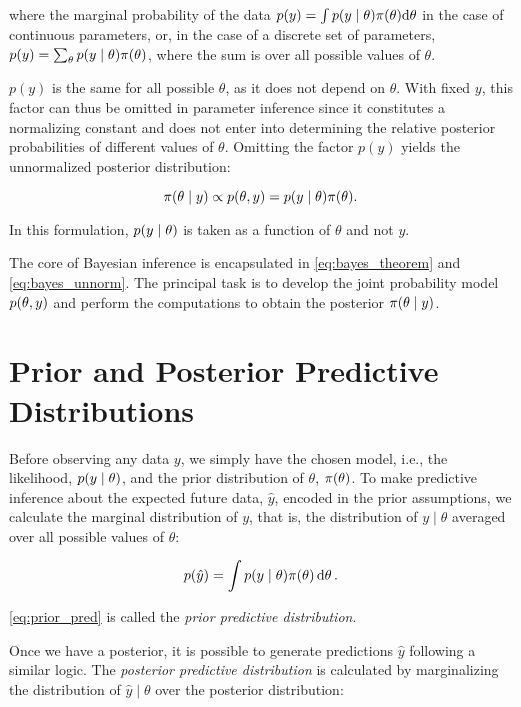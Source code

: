 where the marginal probability of the data $p(y) = \int p \qty(y \mid \theta) \pi \qty(\theta) \dd \theta$ in the case of continuous parameters, or, in the case of a discrete set of parameters, $p(y) = \sum_\theta p \qty(y \mid \theta) \pi \qty(\theta)$, where the sum is over all possible values of $\theta$.

$p(y)$ is the same for all possible $\theta$, as it does not depend on $\theta$. With fixed $y$, this factor can thus be omitted in parameter inference since it constitutes a normalizing constant and does not enter into determining the relative posterior probabilities of different values of $\theta$. Omitting the factor $p(y)$ yields the unnormalized posterior distribution: 

\begin{equation}\label{eq:bayes_unnorm}
    \pi \qty(\theta \mid y) \propto p(\theta, y) =  p \qty(y \mid \theta) \pi \qty(\theta) .
\end{equation}

In this formulation, $p \qty(y \mid \theta)$ is taken as a function of $\theta$ and not $y$.  

The core of Bayesian inference is encapsulated in \autoref{eq:bayes_theorem} and \autoref{eq:bayes_unnorm}. The principal task is to develop the joint probability model $p(\theta, y)$ and perform the computations to obtain the posterior $\pi \qty(\theta \mid y)$.


\section{Prior and Posterior Predictive Distributions}\label{sec:predictive_dist}

Before observing any data $y$, we simply have the chosen model, i.e., the likelihood, $p \qty(y \mid \theta)$, and the prior distribution of $\theta$, $\pi \qty(\theta)$. To make predictive inference about the expected future data, $\hat{y}$, encoded in the prior assumptions, we calculate the marginal distribution of $y$, that is, the distribution of $y \mid \theta$ averaged over all possible values of $\theta$:

\begin{equation}\label{eq:prior_pred}
    p \qty(\hat{y}) = \int p \qty(y \mid \theta) \pi \qty(\theta) \dd{\theta}.
\end{equation}

\autoref{eq:prior_pred} is called the \textit{prior predictive distribution}. 

Once we have a posterior, it is possible to generate predictions $\hat{y}$ following a similar logic. The \textit{posterior predictive distribution} is calculated by marginalizing the distribution of $\hat{y} \mid \theta$ over the posterior distribution: 

